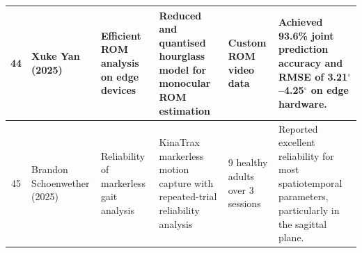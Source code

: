 \documentclass[12pt]{elsarticle}
\begin{document}
{\begin{longtable}{c p{2.7cm} p{2.8cm} p{3.3cm} p{3.4cm} p{3.6cm}}
44 & Xuke Yan \cite{yan2025efficient} (2025) & Efficient ROM analysis on edge devices & Reduced and quantised hourglass model for monocular ROM estimation & Custom ROM video data & Achieved 93.6\% joint prediction accuracy and RMSE of 3.21$^\circ$--4.25$^\circ$ on edge hardware. \\
\hline

45 & Brandon Schoenwether \cite{schoenwether2025reliability} (2025) & Reliability of markerless gait analysis & KinaTrax markerless motion capture with repeated-trial reliability analysis & 9 healthy adults over 3 sessions & Reported excellent reliability for most spatiotemporal parameters, particularly in the sagittal plane. \\
\hline

\end{longtable}}
\begingroup

\centering
\end{document}
